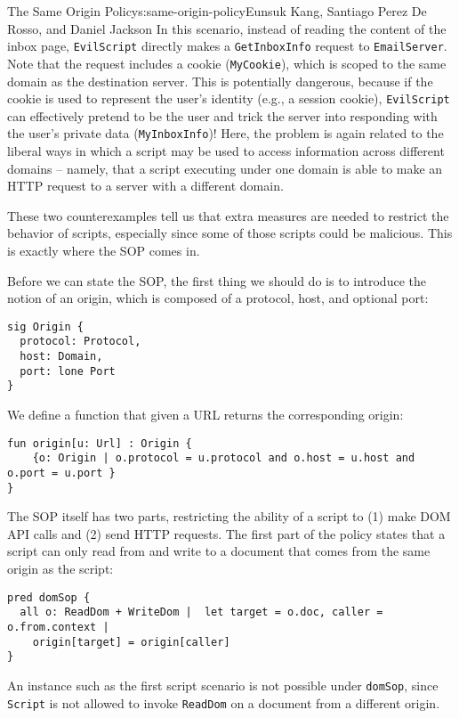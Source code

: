 \begin{aosachapter}{The Same Origin Policy}{s:same-origin-policy}{Eunsuk Kang, Santiago Perez De Rosso, and Daniel Jackson}
In this scenario, instead of reading the content of the inbox page,
\texttt{EvilScript} directly makes a \texttt{GetInboxInfo} request to
\texttt{EmailServer}. Note that the request includes a cookie
(\texttt{MyCookie}), which is scoped to the same domain as the
destination server. This is potentially dangerous, because if the cookie
is used to represent the user's identity (e.g., a session cookie),
\texttt{EvilScript} can effectively pretend to be the user and trick the
server into responding with the user's private data
(\texttt{MyInboxInfo})! Here, the problem is again related to the
liberal ways in which a script may be used to access information across
different domains -- namely, that a script executing under one domain is
able to make an HTTP request to a server with a different domain.

These two counterexamples tell us that extra measures are needed to
restrict the behavior of scripts, especially since some of those scripts
could be malicious. This is exactly where the SOP comes in.

\label{same-origin-policy}

Before we can state the SOP, the first thing we should do is to
introduce the notion of an origin, which is composed of a protocol,
host, and optional port:

\begin{verbatim}
sig Origin {
  protocol: Protocol,
  host: Domain,
  port: lone Port
}
\end{verbatim}

We define a function that given a URL returns the corresponding origin:

\begin{verbatim}
fun origin[u: Url] : Origin {
    {o: Origin | o.protocol = u.protocol and o.host = u.host and o.port = u.port }
}
\end{verbatim}

The SOP itself has two parts, restricting the ability of a script to (1)
make DOM API calls and (2) send HTTP requests. The first part of the
policy states that a script can only read from and write to a document
that comes from the same origin as the script:

\begin{verbatim}
pred domSop {
  all o: ReadDom + WriteDom |  let target = o.doc, caller = o.from.context |
    origin[target] = origin[caller] 
}
\end{verbatim}

An instance such as the first script scenario is not possible under
\texttt{domSop}, since \texttt{Script} is not allowed to invoke
\texttt{ReadDom} on a document from a different origin.


\end{aosachapter}
